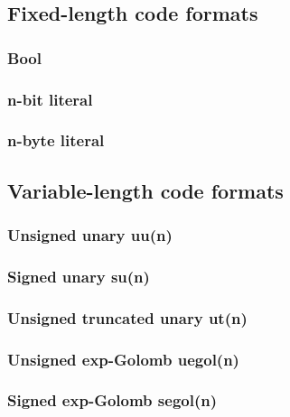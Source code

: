 

\subsection{Fixed-length code formats}
\subsubsection{Bool}
\subsubsection{n-bit literal}
\subsubsection{n-byte literal}
\subsection{Variable-length code formats}
\subsubsection{Unsigned unary uu(n)}
\subsubsection{Signed unary su(n)}
\subsubsection{Unsigned truncated unary ut(n)}
\subsubsection{Unsigned exp-Golomb uegol(n)}
\subsubsection{Signed exp-Golomb segol(n)}
